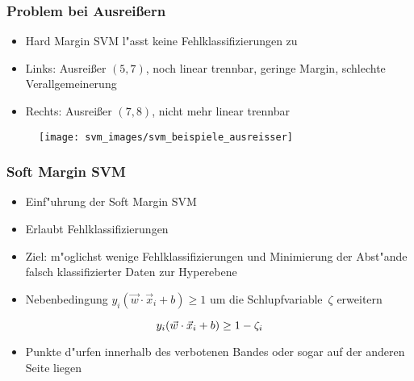
\begin{frame}

\frametitle{Problem bei Ausrei{\ss}ern}

\begin{itemize}
	\setlength{\itemsep}{7pt}
	\item Hard Margin SVM l"asst keine Fehlklassifizierungen zu
	\item Links: Ausrei{\ss}er $(5,7)$, noch linear trennbar, geringe Margin, schlechte Verallgemeinerung
	\item Rechts: Ausrei{\ss}er $(7,8)$, nicht mehr linear trennbar
\end{itemize}

\begin{figure}[h]
\centering
\texttt{[image: svm\_images/svm\_beispiele\_ausreisser]}
\end{figure}

\end{frame}






\begin{frame}

\frametitle{Soft Margin SVM}

\begin{itemize}
	\setlength{\itemsep}{13pt}
	\item Einf"uhrung der Soft Margin SVM
	\item Erlaubt Fehlklassifizierungen
	\item Ziel: m"oglichst wenige Fehlklassifizierungen und Minimierung der Abst"ande falsch klassifizierter Daten zur Hyperebene
	\item Nebenbedingung $y_i (\vec{w} \cdot \vec{x}_i + b) \geq 1$ um die Schlupfvariable~$\zeta$ erweitern
\end{itemize}

\begin{equation}
	y_i (\vec{w} \cdot \vec{x}_i + b) \geq 1 - \zeta_i \notag
\end{equation}

\begin{itemize}
	\setlength{\itemsep}{13pt}
	\item Punkte d"urfen innerhalb des verbotenen Bandes oder sogar auf der anderen Seite liegen
\end{itemize}

\end{frame}






